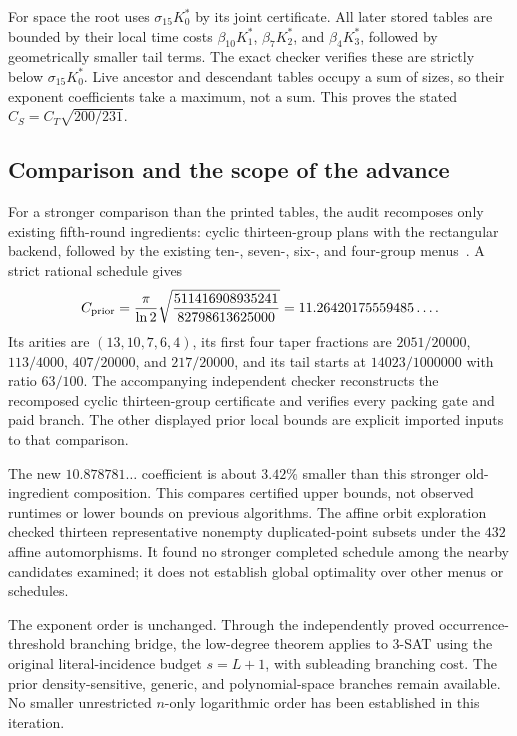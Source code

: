 For space the root uses $\sigma_{15}K_0^*$ by its joint certificate.
All later stored tables are bounded by their local time costs
$\beta_{10}K_1^*$, $\beta_7K_2^*$, and $\beta_4K_3^*$, followed by
geometrically smaller tail terms. The exact checker verifies these are
strictly below $\sigma_{15}K_0^*$. Live ancestor and descendant tables
occupy a sum of sizes, so their exponent coefficients take a maximum,
not a sum. This proves the stated $C_S=C_T\sqrt{200/231}$.

\subsection{Comparison and the scope of the advance}

For a stronger comparison than the printed tables, the audit recomposes
only existing fifth-round ingredients: cyclic thirteen-group plans with
the rectangular backend, followed by the existing ten-, seven-, six-,
and four-group menus~\cite{pairwise,affinegeometry,affinecauchy}. A strict rational schedule gives
\[
 C_{\rm prior}=\frac\pi{\ln2}
 \sqrt{\frac{511416908935241}{82798613625000}}
 =11.26420175559485\ldots.
\]
Its arities are $(13,10,7,6,4)$, its first four taper fractions are
$2051/20000$, $113/4000$, $407/20000$, and $217/20000$, and its tail starts
at $14023/1000000$ with ratio $63/100$. The accompanying independent
checker reconstructs the recomposed cyclic thirteen-group certificate and
verifies every packing gate and paid branch. The other displayed prior
local bounds are explicit imported inputs to that comparison.

The new $10.878781\ldots$ coefficient is about $3.42\%$ smaller than
this stronger old-ingredient composition. This compares certified upper
bounds, not observed runtimes or lower bounds on previous algorithms.
The affine orbit exploration checked thirteen representative nonempty
duplicated-point subsets under the $432$ affine automorphisms. It found
no stronger completed schedule among the nearby candidates examined;
it does not establish global optimality over other menus or schedules.

The exponent order is unchanged. Through the independently proved
occurrence-threshold branching bridge, the low-degree theorem applies to
3-SAT using the original literal-incidence budget $s=L+1$, with subleading
branching cost. The prior density-sensitive, generic, and polynomial-space
branches remain available. No smaller unrestricted $n$-only logarithmic
order has been established in this iteration.
